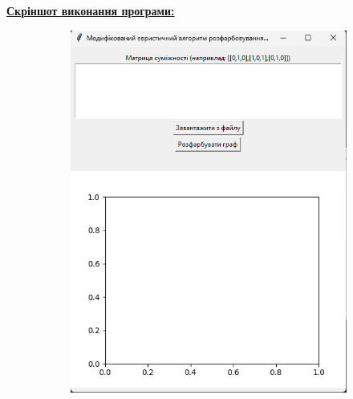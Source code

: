 \documentclass[12pt,a4paper]{article}
\begin{document}
    \newpage

    \textbf{\underline{Скріншот виконання програми:}}

    \begin{figure}[htbp]
        \begin{subfigure}{0.35\textwidth}
            \includegraphics[width=\linewidth]{ex0.png}
            \label{fig:a}
        \end{subfigure}
        \begin{subfigure}{0.35\textwidth}

\end{subfigure}
\end{figure}
\end{document}
